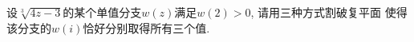 \documentclass[a4paper,12pt]{ctexart}
\title{\TITLE}
\author{\AUTHOR}
\date{\today}
\begin{document}

    \maketitle
    \thispagestyle{empty}





    \newpage
    \pagestyle{fancy}
    \linenumbers
    
    \begin{problem}
        设$\sqrt[3]{4z-3}$的某个单值分支$w(z)$满足$w(2)>0$, 请用三种方式割破复平面
        使得该分支的$w(i)$恰好分别取得所有三个值.
    \end{problem}
\end{document}
